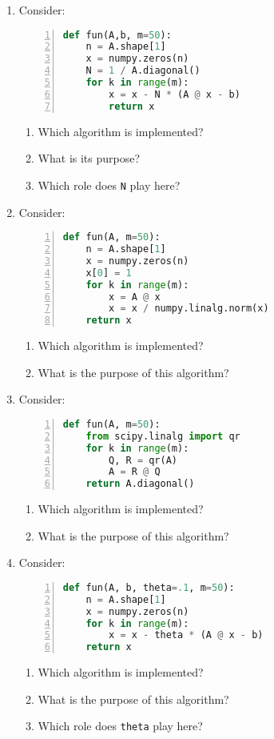 \begin{enumerate}
	\item Consider:
\begin{lstlisting}[language=python,numbers=left]
def fun(A,b, m=50):
    n = A.shape[1]
    x = numpy.zeros(n)
    N = 1 / A.diagonal()		
    for k in range(m):
        x = x - N * (A @ x - b)
        return x
\end{lstlisting}
	\begin{enumerate}
		\item Which algorithm is implemented?
		\item What is its purpose? 
		\item Which role does \verb|N| play here?
	\end{enumerate}
\item Consider:
\begin{lstlisting}[language=python,numbers=left]
def fun(A, m=50):
    n = A.shape[1]
    x = numpy.zeros(n)
    x[0] = 1	
    for k in range(m):
        x = A @ x
        x = x / numpy.linalg.norm(x)
    return x
\end{lstlisting}
\begin{enumerate}
	\item Which algorithm is implemented? 
	\item What is the purpose of this algorithm?
\end{enumerate}
\item Consider:
\begin{lstlisting}[language=python,numbers=left]
def fun(A, m=50):
    from scipy.linalg import qr
    for k in range(m):
        Q, R = qr(A)
        A = R @ Q
    return A.diagonal()
\end{lstlisting}
\begin{enumerate}
	\item Which algorithm is implemented? 
	\item What is the purpose of this algorithm?
\end{enumerate}
\item Consider:
\begin{lstlisting}[language=python,numbers=left]
def fun(A, b, theta=.1, m=50):
    n = A.shape[1]
    x = numpy.zeros(n)		
    for k in range(m):
        x = x - theta * (A @ x - b)
    return x
\end{lstlisting}
\begin{enumerate}
	\item Which algorithm is implemented? 
	\item What is the purpose of this algorithm?
	\item Which role does \verb|theta| play here?
\end{enumerate}
\end{enumerate}
 